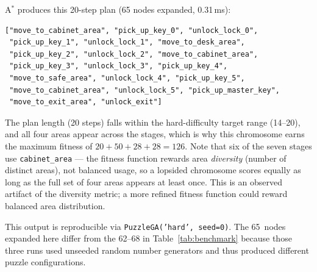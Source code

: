 \documentclass[12pt, a4paper]{report}
\begin{document}
A$^{\ast}$ produces this 20-step plan (65 nodes expanded, 0.31\,ms):

\begin{lstlisting}[style=pyStyle, caption={A* plan for the seed-0 champion.}]
["move_to_cabinet_area", "pick_up_key_0", "unlock_lock_0",
 "pick_up_key_1", "unlock_lock_1", "move_to_desk_area",
 "pick_up_key_2", "unlock_lock_2", "move_to_cabinet_area",
 "pick_up_key_3", "unlock_lock_3", "pick_up_key_4",
 "move_to_safe_area", "unlock_lock_4", "pick_up_key_5",
 "move_to_cabinet_area", "unlock_lock_5", "pick_up_master_key",
 "move_to_exit_area", "unlock_exit"]
\end{lstlisting}

The plan length (20 steps) falls within the hard-difficulty target range (14--20), and all four areas appear across the stages, which is why this chromosome earns the maximum fitness of $20 + 50 + 28 + 28 = 126$.  Note that six of the seven stages use \texttt{cabinet\_area} --- the fitness function rewards area \emph{diversity} (number of distinct areas), not balanced usage, so a lopsided chromosome scores equally as long as the full set of four areas appears at least once.  This is an observed artifact of the diversity metric; a more refined fitness function could reward balanced area distribution.

This output is reproducible via \texttt{PuzzleGA('hard',~seed=0)}.  The 65~nodes expanded here differ from the 62--68 in Table~\ref{tab:benchmark} because those three runs used unseeded random number generators and thus produced different puzzle configurations.
\end{document}
